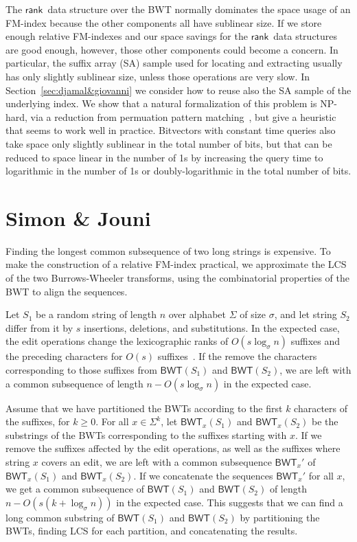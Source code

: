 \documentclass{llncs}
\newcommand{\BWT}
  {\ensuremath{\mathsf{BWT}}}
\newcommand{\rank}
  {\ensuremath{\mathsf{rank}}}
\begin{document}
The \rank\ data structure over the BWT normally dominates the space usage of an FM-index because the other components all have sublinear size.  If we store enough relative FM-indexes and our space savings for the \rank\ data structures are good enough, however, those other components could become a concern.  In particular, the suffix array (SA) sample used for locating and extracting usually has only slightly sublinear size, unless those operations are very slow.  In Section~\ref{sec:djamal&giovanni} we consider how to reuse also the SA sample of the underlying index.  We show that a natural formalization of this problem is NP-hard, via a reduction from permuation pattern matching~\cite{??}, but give a heuristic that seems to work well in practice.  Bitvectors with constant time queries also take space only slightly sublinear in the total number of bits, but that can be reduced to space linear in the number of 1s by increasing the query time to logarithmic in the number of 1s or doubly-logarithmic in the total number of bits.


\section{Simon \& Jouni}
\label{sec:simon&jouni}

Finding the longest common subsequence of two long strings is expensive. To make the construction of a relative FM-index practical, we approximate the LCS of the two Burrows-Wheeler transforms, using the combinatorial properties of the BWT to align the sequences.

Let $S_{1}$ be a random string of length $n$ over alphabet $\Sigma$ of size $\sigma$, and let string $S_{2}$ differ from it by $s$ insertions, deletions, and substitutions. In the expected case, the edit operations change the lexicographic ranks of $O(s \log_{\sigma} n)$ suffixes and the preceding characters for $O(s)$ suffixes~\cite{MNSV10}. If the remove the characters corresponding to those suffixes from $\BWT(S_{1})$ and $\BWT(S_{2})$, we are left with a common subsequence of length $n - O(s \log_{\sigma} n)$ in the expected case.

Assume that we have partitioned the BWTs according to the first $k$ characters of the suffixes, for $k \ge 0$. For all $x \in \Sigma^{k}$, let $\BWT_{x}(S_{1})$ and $\BWT_{x}(S_{2})$ be the substrings of the BWTs corresponding to the suffixes starting with $x$. If we remove the suffixes affected by the edit operations, as well as the suffixes where string $x$ covers an edit, we are left with a common subsequence $\BWT_{x}'$ of $\BWT_{x}(S_{1})$ and $\BWT_{x}(S_{2})$. If we concatenate the sequences $\BWT_{x}'$ for all $x$, we get a common subsequence of $\BWT(S_{1})$ and $\BWT(S_{2})$ of length $n - O(s (k + \log_{\sigma} n))$ in the expected case. This suggests that we can find a long common substring of $\BWT(S_{1})$ and $\BWT(S_{2})$ by partitioning the BWTs, finding LCS for each partition, and concatenating the results.
\end{document}
